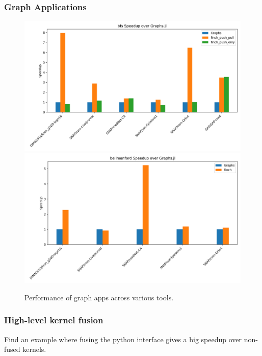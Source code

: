 \documentclass{article}
\begin{document}
\subsubsection{Graph Applications}
\begin{figure}
	\includegraphics[width=\linewidth]{bfs_speedup_over_graphs.jl.png}
	\includegraphics[width=\linewidth]{bellmanford_speedup_over_graphs.jl.png}
    \caption{Performance of graph apps across various tools.}
\end{figure}

\subsubsection{High-level kernel fusion}
Find an example where fusing the python interface gives a big speedup over non-fused kernels.



\end{document}
